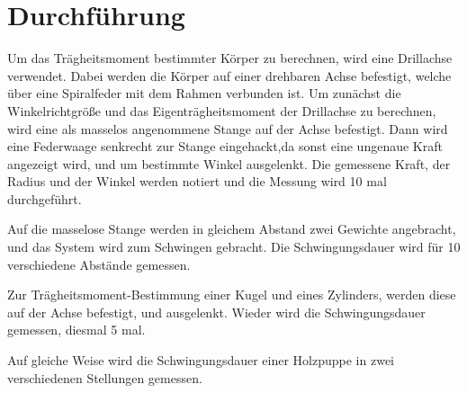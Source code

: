 \section{Durchführung}
\label{sec:Durchführung}

Um das Trägheitsmoment bestimmter Körper zu berechnen, wird eine Drillachse verwendet.
Dabei werden die Körper auf einer drehbaren Achse befestigt, welche über eine Spiralfeder mit dem Rahmen verbunden ist.
Um zunächst die Winkelrichtgröße und das Eigenträgheitsmoment der Drillachse zu berechnen,
wird eine als masselos angenommene Stange auf der Achse befestigt. 
Dann wird eine Federwaage senkrecht zur Stange eingehackt,da sonst eine ungenaue Kraft angezeigt wird, und um bestimmte Winkel ausgelenkt.
Die gemessene Kraft, der Radius und der Winkel werden notiert und die Messung wird 10 mal durchgeführt.

Auf die masselose Stange werden in gleichem Abstand zwei Gewichte angebracht, und das System wird zum Schwingen gebracht.
Die Schwingungsdauer wird für 10 verschiedene Abstände gemessen.

Zur Trägheitsmoment-Bestimmung einer Kugel und eines Zylinders, werden diese auf der Achse befestigt, und ausgelenkt.
Wieder wird die Schwingungsdauer gemessen, diesmal 5 mal. 

Auf gleiche Weise wird die Schwingungsdauer einer Holzpuppe in zwei verschiedenen Stellungen gemessen.

